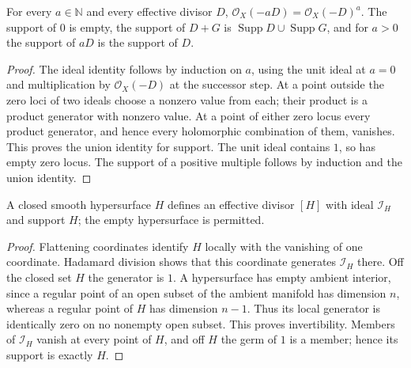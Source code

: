 \begin{lemma}
\label{hir:effective-divisor-multiples}
For every $a\in\mathbb N$ and every effective divisor $D$,
$\mathcal O_X(-aD)=\mathcal O_X(-D)^a$.
The support of $0$ is empty, the support of $D+G$ is
$\operatorname{Supp}D\cup\operatorname{Supp}G$, and for $a>0$ the support
of $aD$ is the support of $D$.
\leanok
\end{lemma}
\begin{proof}
The ideal identity follows by induction on $a$, using the unit ideal at
$a=0$ and multiplication by $\mathcal O_X(-D)$ at the successor step.
At a point outside the zero loci of two ideals choose a nonzero value from
each; their product is a product generator with nonzero value. At a point
of either zero locus every product generator, and hence every holomorphic
combination of them, vanishes. This proves the union identity for support.
The unit ideal contains $1$, so has empty zero locus. The support of a
positive multiple follows by induction and the union identity.
\end{proof}

\begin{lemma}
\label{hir:smooth-hypersurface-effective-divisor}
A closed smooth hypersurface $H$ defines an effective divisor $[H]$ with
ideal $\mathcal I_H$ and support $H$; the empty hypersurface is permitted.
\leanok
\end{lemma}
\begin{proof}
Flattening coordinates identify $H$ locally with the vanishing of one
coordinate. Hadamard division shows that this coordinate generates
$\mathcal I_H$ there. Off the closed set $H$ the generator is $1$.
A hypersurface has empty ambient interior, since a regular point of an
open subset of the ambient manifold has dimension $n$, whereas a regular
point of $H$ has dimension $n-1$. Thus its local generator is identically
zero on no nonempty open subset. This proves invertibility. Members of
$\mathcal I_H$ vanish at every point of $H$, and off $H$ the germ of $1$
is a member; hence its support is exactly $H$.
\end{proof}

